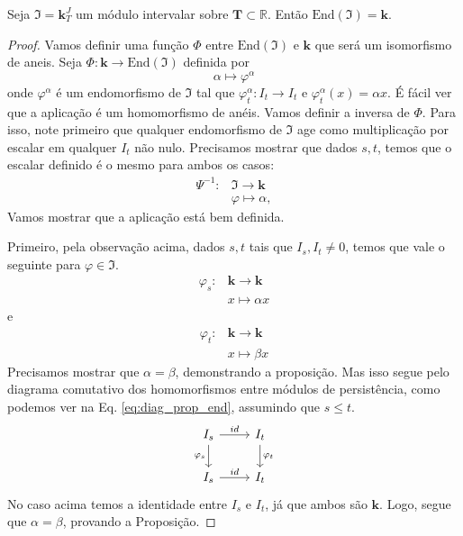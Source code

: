 \begin{propo}
    Seja $\mathfrak{I} = \mathbf{k}^J_T$ um módulo intervalar sobre $\mathbf{T} \subset \mathbb{R}$. 
    Então $\text{End}(\mathfrak{I}) = \mathbf{k}$. 
\end{propo}
\begin{proof}
    Vamos definir uma função $\Phi$ entre $\text{End}(\mathfrak{I})$ e $\mathbf{k}$ que será um isomorfismo
    de aneis.
    Seja $\Phi \colon \mathbf{k} \to \text{End}(\mathfrak{I})$ definida por 
    \begin{equation*}
        \alpha \mapsto \varphi^{\alpha}
    \end{equation*}
    onde $\varphi^\alpha$ é um endomorfismo de $\mathfrak{I}$ tal que $\varphi_t^{\alpha} \colon I_t 
    \to I_t$ e $\varphi^{\alpha}_t (x) = \alpha x$. É fácil ver que a aplicação é um homomorfismo de anéis.
    Vamos definir a inversa de $\Phi$. Para isso, note primeiro que qualquer endomorfismo de $\mathfrak{I}$
    age como multiplicação por escalar em qualquer $I_t$ não nulo. Precisamos mostrar que dados $s,t$, temos 
    que o escalar definido é o mesmo para ambos os casos:
    \begin{align*}
        \Psi^{-1} \colon & \mathfrak{I} \to \mathbf{k} \\
                         & \varphi \mapsto \alpha,
    \end{align*}
    Vamos mostrar que a aplicação está bem definida.
    
    Primeiro, pela observação acima, dados $s,t$ tais que $I_s, I_t \neq 0$, temos que vale o seguinte
    para $\varphi \in \mathfrak{I}$.
    \begin{align*}
        \varphi_s \colon & \mathbf{k} \to \mathbf{k} \\
                         &     x \mapsto \alpha x 
    \end{align*}
    e 
    \begin{align*}
        \varphi_t \colon & \mathbf{k} \to \mathbf{k} \\
                         &     x \mapsto \beta x 
    \end{align*}
    Precisamos mostrar que $\alpha = \beta$, demonstrando a proposição. Mas isso segue pelo 
    diagrama comutativo dos homomorfismos entre módulos de persistência, como podemos ver na 
    Eq. \eqref{eq:diag_prop_end}, assumindo que $s \leq t$. 
    \begin{equation}
        \label{eq:diag_prop_end}
        \begin{tikzcd}
            I_s \arrow{d}[swap]{\varphi_s} \arrow{r}{id} & I_t \arrow{d}{\varphi_t} \\
            I_s \arrow{r}{id}                     & I_t                    
        \end{tikzcd} 
    \end{equation}
    No caso acima temos a identidade entre $I_s$ e $I_t$, já que ambos são $\mathbf{k}$. Logo,
    segue que $\alpha=\beta$, provando a Proposição.
\end{proof}

